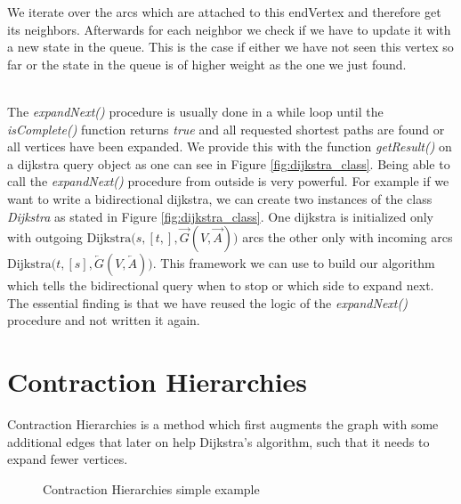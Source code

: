 We iterate over the arcs which are attached to this endVertex and therefore get its neighbors.
Afterwards for each neighbor we check if we have to update it with a new state in the queue.
This is the case if either we have not seen this vertex so far or the state in the queue is of higher weight as the one we just found.

\\
The \textit{expandNext()} procedure is usually done in a while loop until the \textit{isComplete()} function returns \textit{true} and all requested shortest paths are found or all vertices have been expanded.
We provide this with the function \textit{getResult()} on a dijkstra query object as one can see in Figure \ref{fig:dijkstra_class}.
Being able to call the \textit{expandNext()} procedure from outside is very powerful.
For example if we want to write a bidirectional dijkstra, we can create two instances of the class \textit{Dijkstra} as stated in Figure \ref{fig:dijkstra_class}.
One dijkstra is initialized only with outgoing $\text{Dijkstra(}s, [t,], \overrightarrow{G}(V, \overrightarrow{A}) \text{)}$ arcs the other only with incoming arcs $\text{Dijkstra(}t, [s], \overleftarrow{G}(V, \overleftarrow{A}) \text{)}$.
This framework we can use to build our algorithm which tells the bidirectional query when to stop or which side to expand next. 
The essential finding is that we have reused the logic of the \textit{expandNext()} procedure and not written it again.

\section{Contraction Hierarchies}

Contraction Hierarchies \cite{Sanders} is a method which first augments the graph with some additional edges that later on help Dijkstra's algorithm, such that it needs to expand fewer vertices.

\begin{figure}[H]
    \centering
    
    \caption{Contraction Hierarchies simple example}
    \label{fig:ch_simple_example}
\end{figure}

